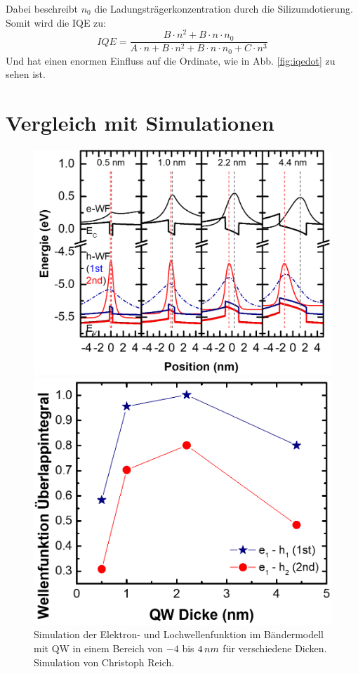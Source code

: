 Dabei beschreibt $n_{0}$ die Ladungsträgerkonzentration durch die Silizumdotierung. 
Somit wird die IQE zu:
\begin{equation}
    IQE = \frac{B \cdot n^2 + B \cdot n \cdot n_{0}}{A \cdot n + B \cdot n^2  + B \cdot n \cdot n_{0}+ C \cdot n^3} 
    \label{eq:dopediqe}
\end{equation}
Und hat einen enormen Einfluss auf die Ordinate, wie in Abb. \ref{fig:iqedot} zu sehen ist.

\section{Vergleich mit Simulationen}
\begin{figure}[H]
  \centering
  \begin{minipage}[t]{0.49\textwidth}
    \centering
    \includegraphics[width=\textwidth]{Bilder/MQWdickenSerie/Simu1.png}
		\caption{Simulation der Elektron- und Lochwellenfunktion im Bändermodell mit QW in einem Bereich von $-4$ bis $4 \thinspace nm$ für verschiedene Dicken. Simulation von Christoph Reich.}
    \label{fig:undotiertSpektrum}
  \end{minipage}
	\hfill
  \begin{minipage}[t]{0.49\textwidth}
    \centering
    \includegraphics[width=\linewidth]{Bilder/MQWdickenSerie/Simu2.png}

\end{minipage}
\end{figure}
